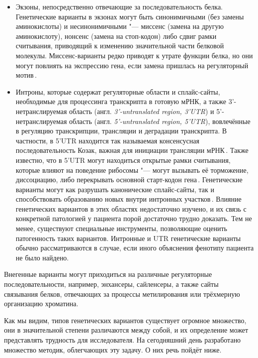 \documentclass[a4paper,14pt]{extarticle}
\newcommand{\ecitep}[1]{\textenglish{\citep{#1}}}
\newcommand{\engterm}[1]{англ. \textenglish{\textit{#1}}}
\begin{document}
\begin{itemize}
	\item Экзоны, непосредственно отвечающие за последовательность белка.
	 Генетические варианты в экзонах могут быть синонимичными (без замены аминокислоты) и несинонимичными "--- миссенс (замена на другую аминокислоту), нонсенс (замена на стоп-кодон) либо сдвиг рамки считывания, приводящий к изменению значительной части белковой молекулы.
	 Миссенс-варианты редко приводят к утрате функции белка, но они могут повлиять на экспрессию гена, если замена пришлась на регуляторный мотив\,\ecitep{j_Brea_Fernandez_2011}.
	\item Интроны, которые содержат регуляторные области и сплайс-сайты, необходимые для процессинга транскрипта в готовую мРНК, а также 3'\hyp{}не\-транслируемая область (\engterm{3'\hyp{}untranslated region, 3'UTR}) и 5'\hyp{}нетранслируемая область (\engterm{5'\hyp{}untranslated region, 5'UTR}), вовлечённые в регуляцию транскрипции, трансляции и деградации транскрипта.
	 В частности, в 5'UTR находится так называемая консенсусная последовательность Козак, важная для инициации трансляции мРНК\,\ecitep{Kozak_1987}.
	 Также известно, что в 5'UTR могут находиться открытые рамки считывания, которые влияют на поведение рибосомы "--- могут вызывать её торможение, диссоциацию, либо перекрывать основной старт-кодон гена\,\ecitep{Young_2016}.
	 Генетические варианты могут как разрушать канонические сплайс-сайты, так и способствовать образованию новых внутри интронных участков\,\ecitep{Abramowicz_2018}.
	 Влияние генетических вариантов в этих областях недостаточно изучено, и их связь с конкретной патологией у пациента порой достаточно трудно доказать.
	 Тем не менее, существуют специальные инструменты, позволяющие оценить патогенность таких вариантов.
	 Интронные и UTR генетические варианты обычно рассматриваются в случае, если иного объяснения фенотипу пациента не было найдено.
\end{itemize}

Внегенные варианты могут приходиться на различные регуляторные последовательности, например, энхансеры, сайленсеры, а также сайты связывания белков, отвечающих за процессы метилирования или трёхмерную организацию хроматина.

Как мы видим, типов генетических вариантов существует огромное множество, они в значительной степени различаются между собой, и их определение может представлять трудность для исследователя.
На сегодняшний день разработано множество методик, облегчающих эту задачу.
О них речь пойдёт ниже.
\end{document}

